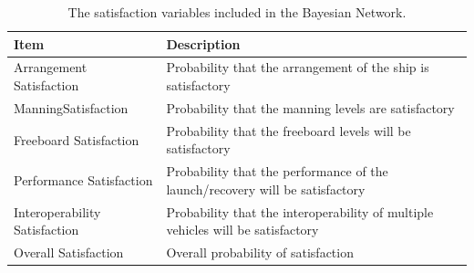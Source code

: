 \documentclass{svproc}
\begin{document}
\begin{table}[htb]
\begin{center}
\setlength\extrarowheight{3.5pt}
\caption{The satisfaction variables included in the Bayesian Network.}
\begin{tabular}{p{3.5cm}  p{8.7cm}}
\hline
Item                          & Description                                                                        \\
\hline
\hline 
Arrangement \linebreak Satisfaction      & Probability that the arrangement of the ship is satisfactory                       \\
Manning\linebreak Satisfaction          & Probability that the manning levels are satisfactory                                \\
Freeboard \linebreak Satisfaction        & Probability that the freeboard levels will be satisfactory                         \\
Performance \linebreak Satisfaction      & Probability that the performance of the launch/recovery will be satisfactory       \\
Interoperability \linebreak Satisfaction & Probability that the interoperability of multiple vehicles will be satisfactory                 \\
Overall Satisfaction          & Overall probability of satisfaction  \\   
\hline
\end{tabular}
\label{table:variables2}
\end{center}
\end{table}
\end{document}
